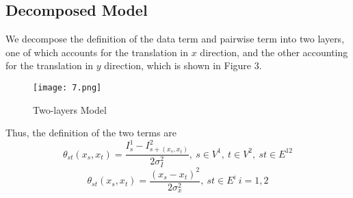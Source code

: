 \documentclass[11pt]{article}
\begin{document}
\subsection{Decomposed Model}
We decompose the definition of the data term and pairwise term into two layers, one of which accounts for the translation in $x$ direction, and the other accounting for the translation in $y$ direction, which is shown in Figure 3.
        \begin{figure}[!htp]
            \centering
            \texttt{[image: 7.png]}
            \caption{Two-layers Model}
        \end{figure}
Thus, the definition of the two terms are
\begin{equation}
    \theta_{st}(x_s, x_t) = \frac{I_s^1 - I_{s+(x_s, x_t)}^2}{2\sigma_I^2},\ s\in V^1,\ t\in V^2,\ st \in E^{12}
\end{equation}
\begin{equation}
    \theta_{st}(x_s, x_t) = \frac{(x_s - x_t)^2}{2\sigma_{x}^2},\ st\in E^{i}\ i = 1,2
\end{equation}
\end{document}
